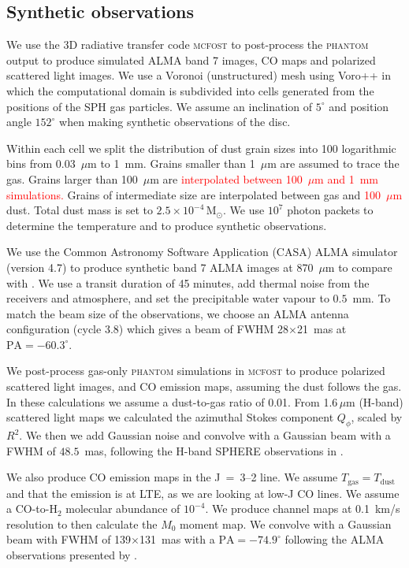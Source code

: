 \documentclass[usenatbib,a4paper,times]{mnras}
\renewcommand{\sun}{\mathrm{M}_{\odot}}
\newcommand{\mcfost}{\textsc{mcfost}}
\renewcommand{\phantom}{\textsc{phantom}}
\newcommand{\new}[1]{{\textcolor{red}{#1}}}
\begin{document}
\subsection{Synthetic observations}

We use the 3D radiative transfer code \mcfost{} \citep{pinte:2006, pinte:2009}
to post-process the \phantom{} output to produce simulated ALMA band 7 images,
CO maps and polarized scattered light images. We use a Voronoi (unstructured)
mesh using Voro++ \citep{rycroft:2009} in which the computational domain is
subdivided into cells generated from the positions of the SPH gas particles. We
assume an inclination of $5^{\circ}$ and position angle $152^{\circ}$
\citep{huang:2018} when making synthetic observations of the disc.

Within each cell we split the distribution of dust grain sizes into 100
logarithmic bins from 0.03~$\mu$m to 1~mm. Grains smaller than 1~$\mu$m are
assumed to trace the gas. Grains larger than 100~$\mu$m are \new{interpolated
between 100~$\mu$m and 1~mm simulations.} Grains of intermediate size are
interpolated between gas and \new{100~$\mu$m} dust. Total dust mass is set to
$2.5\times 10^{-4}\,\sun{}$. We use $10^7$ photon packets to determine the
temperature and to produce synthetic observations.

We use the Common Astronomy Software Application (CASA) ALMA simulator (version
4.7) to produce synthetic band 7 ALMA images at 870~$\mu$m to compare with
\citet{andrews:2016}. We use a transit duration of 45 minutes, add thermal noise
from the receivers and atmosphere, and set the precipitable water vapour to
$0.5$~mm. To match the beam size of the observations, we choose an ALMA antenna
configuration (cycle 3.8) which gives a beam of FWHM 28$\times$21~mas at
$\mathrm{PA}=-60.3^{\circ}$.

We post-process gas-only \phantom{} simulations in \mcfost{} to produce
polarized scattered light images, and CO emission maps, assuming the dust
follows the gas. In these calculations we assume a dust-to-gas ratio of 0.01.
From 1.6$\,\mu$m (H-band) scattered light maps we calculated the azimuthal
Stokes component $Q_{\phi}$, scaled by $R^2$. We then we add Gaussian noise and
convolve with a Gaussian beam with a FWHM of $48.5$~mas, following the H-band
SPHERE observations in \citet{van-boekel:2017}.

We also produce CO emission maps in the J~=~3--2 line. We assume
$T_{\mathrm{gas}} = T_{\mathrm{dust}}$ and that the emission is at LTE, as we
are looking at low-J CO lines. We assume a CO-to-H${}_2$ molecular abundance of
$10^{-4}$. We produce channel maps at 0.1~km/s resolution to then calculate the
$M_0$ moment map. We convolve with a Gaussian beam with FWHM of
139$\times$131~mas with a $\mathrm{PA}=-74.9^{\circ}$ following the ALMA
observations presented by \citet{huang:2018}.
\end{document}
